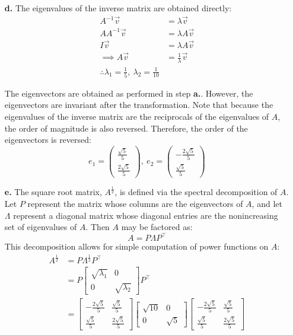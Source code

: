 \documentclass[oneside,12pt,letterpaper]{article}
\begin{document}
\begin{enumerate}
\begin{enumerate}
				\item[\textbf{d.}]
					The eigenvalues of the inverse matrix are obtained directly:
					\begin{align*}
						A^{-1}\vec{v} &= \lambda \vec{v} \\
						AA^{-1}\vec{v} &= \lambda A \vec{v} \\
						I \vec{v} &= \lambda A \vec{v} \\
						\implies A \vec{v} &= \frac{1}{\lambda} \vec{v} \\
						\therefore \lambda_{1}=\frac{1}{5},\ \lambda_{2}=\frac{1}{10}
					\end{align*}

					The eigenvectors are obtained as performed in step \textbf{a.}. However, the eigenvectors are invariant after the transformation. Note that because the eigenvalues of the inverse matrix are the reciprocals of the eigenvalues of $A$, the order of magnitude is also reversed. Therefore, the order of the eigenvectors is reversed: $$e_{1} = \begin{pmatrix} \frac{\sqrt{5}}{5} \\ \frac{2 \sqrt{5}}{5} \end{pmatrix},\ e_{2} = \begin{pmatrix} -\frac{2 \sqrt{5}}{5} \\ \frac{\sqrt{5}}{5} \end{pmatrix}$$

				\item[\textbf{e.}]
					The square root matrix, $A^{\frac{1}{2}}$, is defined via the spectral decomposition of $A$. Let $P$ represent the matrix whose columns are the eigenvectors of $A$, and let $\Lambda$ represent a diagonal matrix whose diagonal entries are the nonincreasing set of eigenvalues of $A$. Then $A$ may be factored as: $$A = P \Lambda P^\intercal$$ This decomposition allows for simple computation of power functions on $A$:
					\begin{align*}
						A^{\frac{1}{2}} &= P \Lambda^{\frac{1}{2}} P^{\intercal} \\
														&= P \begin{bmatrix} \sqrt{\lambda_{1}} & 0 \\ 0 & \sqrt{\lambda_{2}} \end{bmatrix} P^{\intercal} \\
														&= \begin{bmatrix} -\frac{2\sqrt{5}}{5} & \frac{\sqrt{5}}{5} \\ \frac{\sqrt{5}}{5} & \frac{2 \sqrt{5}}{5} \end{bmatrix} 
						\begin{bmatrix}  \sqrt{10} & 0 \\ 0 & \sqrt{5} \end{bmatrix} 
						\begin{bmatrix}  -\frac{2\sqrt{5}}{5} & \frac{\sqrt{5}}{5} \\ \frac{\sqrt{5}}{5} & \frac{2 \sqrt{5}}{5} \end{bmatrix}
					\end{align*}


\end{enumerate}
\end{enumerate}
\end{document}
